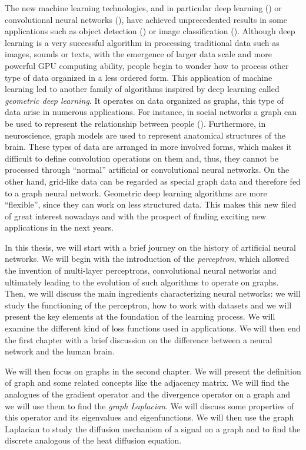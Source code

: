 \documentclass[12pt,a4paper]{report}
\theoremstyle{definition}
\begin{document}
The new machine learning technologies, and in particular deep learning (\cite{deep_learning_lechun}) or convolutional neural networks (\cite{conv_NN_lechun}), have achieved unprecedented results in some applications such as object detection (\cite{object_detection}) or image classification (\cite{image_class}).
Although deep learning is a very successful algorithm in processing traditional data such as images, sounds or texts, with the emergence of larger data scale and more powerful GPU computing ability, people begin to wonder how to process other type of data organized in a less ordered form.
This application of machine learning led to another family of algorithms inspired by deep learning called \emph{geometric deep learning}.
It operates on data organized as graphs, this type of data arise in numerous applications.
For instance, in social networks a graph can be used to represent the relationship between people (\cite{social_network_intro}).
Furthermore, in neuroscience, graph models are used to represent anatomical structures of the brain.
These types of data are arranged in more involved forms, which makes it difficult to define convolution operations on them and, thus, they cannot be processed through ``normal'' artificial or convolutional neural networks.
On the other hand, grid-like data can be regarded as special graph data and therefore fed to a graph neural network.
Geometric deep learning algorithms are more ``flexible'', since they can work on less structured data.
This makes this new filed of great interest nowadays and with the prospect of finding exciting new applications in the next years.

In this thesis, we will start with a brief journey on the history of artificial neural networks.
We will begin with the introduction of the \emph{perceptron}, which allowed the invention of multi-layer perceptrons, convolutional neural networks and ultimately leading to the evolution of such algorithms to operate on graphs.
Then, we will discuss the main ingredients characterizing neural networks: we will study the functioning of the perceptron, how to work with datasets and we will present the key elements at the foundation of the learning process.
We will examine the different kind of loss functions used in applications.
We will then end the first chapter with a brief discussion on the difference between a neural network and the human brain.

We will then focus on graphs in the second chapter.
We will present the definition of graph and some related concepts like the adjacency matrix.
We will find the analogues of the gradient operator and the divergence operator on a graph and we will use them to find the \emph{graph Laplacian}.
We will discuss some properties of this operator and its eigenvalues and eigenfunctions.
We will then use the graph Laplacian to study the diffusion mechanism of a signal on a graph and to find the discrete analogous of the heat diffusion equation.
\end{document}
